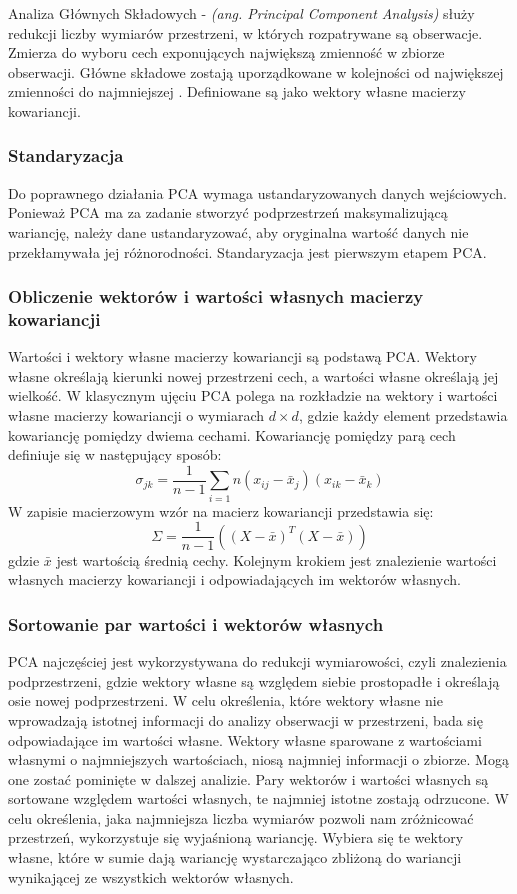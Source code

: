\documentclass[a4paper,12pt,twoside,openany]{report}
\newcommand{\ang}[1]{\textit{(ang. #1)}}
\begin{document}
Analiza Głównych Składowych - \ang{Principal Component Analysis} służy redukcji liczby wymiarów przestrzeni,
w których rozpatrywane są obserwacje.
Zmierza do wyboru cech exponujących największą zmienność w zbiorze obserwacji.
Główne składowe zostają uporządkowane w kolejności od największej zmienności do najmniejszej \cite{Bro2014}.
Definiowane są jako wektory własne macierzy kowariancji.

\subsubsection{Standaryzacja}
Do poprawnego działania PCA wymaga ustandaryzowanych danych wejściowych.
Ponieważ PCA ma za zadanie stworzyć podprzestrzeń maksymalizującą wariancję,
należy dane ustandaryzować, aby oryginalna wartość danych nie 
przekłamywała jej różnorodności.
Standaryzacja jest pierwszym etapem PCA.
\subsubsection{Obliczenie wektorów i wartości własnych macierzy kowariancji}
Wartości i wektory własne macierzy kowariancji są podstawą PCA.
Wektory własne określają kierunki nowej przestrzeni cech, a wartości własne określają jej wielkość.
W klasycznym ujęciu PCA polega na rozkładzie na wektory i wartości własne macierzy kowariancji o wymiarach $d \times d$,
gdzie każdy element przedstawia kowariancję pomiędzy dwiema cechami. 
Kowariancję pomiędzy parą cech definiuje się w następujący sposób:
\begin{equation}
	\sigma_{jk}=\frac{1}{n - 1}\sum_{i=1}{n}(x_{ij}-\bar x_j)(x_{ik} - \bar x_k)
\end{equation}
W zapisie macierzowym wzór na macierz kowariancji przedstawia się:
\begin{equation}
	\Sigma=\frac{1}{n - 1}\left((X-\bar x)^T(X - \bar x)\right)
\end{equation}
gdzie $\bar x$ jest wartością średnią cechy.
Kolejnym krokiem jest znalezienie wartości własnych macierzy kowariancji i odpowiadających im wektorów własnych.
\subsubsection{Sortowanie par wartości i wektorów własnych}
PCA najczęściej jest wykorzystywana do redukcji wymiarowości, 
czyli znalezienia podprzestrzeni, gdzie wektory własne są względem siebie prostopadłe 
i określają osie nowej podprzestrzeni.
W celu określenia, które wektory własne nie wprowadzają istotnej informacji do analizy obserwacji w przestrzeni, bada się odpowiadające im wartości własne.
Wektory własne sparowane z wartościami własnymi o najmniejszych wartościach, 
niosą najmniej informacji o zbiorze. 
Mogą one zostać pominięte w dalszej analizie.
Pary wektorów i wartości własnych są sortowane względem wartości własnych,
te najmniej istotne zostają odrzucone.
W celu określenia, jaka najmniejsza liczba wymiarów pozwoli nam zróżnicować przestrzeń,
wykorzystuje się wyjaśnioną wariancję.
Wybiera się te wektory własne, które w sumie dają wariancję wystarczająco zbliżoną do wariancji wynikającej ze wszystkich wektorów własnych.
\end{document}
